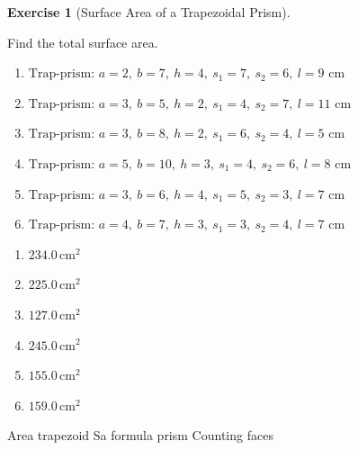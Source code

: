 \documentclass[
  letterpaper,
  DIV=11,
  numbers=noendperiod]{scrreprt}
\theoremstyle{definition}
\newtheorem{exercise}{Exercise}[chapter]
\theoremstyle{remark}
\begin{document}
\begin{exercise}[Surface Area of a Trapezoidal
Prism]\protect\hypertarget{exr-sa-4}{}\label{exr-sa-4}

Find the total surface area.

\begin{enumerate}
\def\labelenumi{\alph{enumi})}
\item
  \(\text{Trap-prism: }a=2,\ b=7,\ h=4,\ s_1=7,\ s_2=6,\ l=9\text{ cm}\)
\item
  \(\text{Trap-prism: }a=3,\ b=5,\ h=2,\ s_1=4,\ s_2=7,\ l=11\text{ cm}\)
\item
  \(\text{Trap-prism: }a=3,\ b=8,\ h=2,\ s_1=6,\ s_2=4,\ l=5\text{ cm}\)
\item
  \(\text{Trap-prism: }a=5,\ b=10,\ h=3,\ s_1=4,\ s_2=6,\ l=8\text{ cm}\)
\item
  \(\text{Trap-prism: }a=3,\ b=6,\ h=4,\ s_1=5,\ s_2=3,\ l=7\text{ cm}\)
\item
  \(\text{Trap-prism: }a=4,\ b=7,\ h=3,\ s_1=3,\ s_2=4,\ l=7\text{ cm}\)
\end{enumerate}

\begin{tcolorbox}[enhanced jigsaw, opacitybacktitle=0.6, coltitle=black, arc=.35mm, colframe=quarto-callout-tip-color-frame, colback=white, bottomrule=.15mm, left=2mm, colbacktitle=quarto-callout-tip-color!10!white, titlerule=0mm, opacityback=0, title=\textcolor{quarto-callout-tip-color}{\faLightbulb}\hspace{0.5em}{🔍 View Solution}, leftrule=.75mm, breakable, rightrule=.15mm, bottomtitle=1mm, toptitle=1mm, toprule=.15mm]

\begin{enumerate}
\def\labelenumi{\alph{enumi})}
\item
  \(234.0\,\text{cm}^{2}\)
\item
  \(225.0\,\text{cm}^{2}\)
\item
  \(127.0\,\text{cm}^{2}\)
\item
  \(245.0\,\text{cm}^{2}\)
\item
  \(155.0\,\text{cm}^{2}\)
\item
  \(159.0\,\text{cm}^{2}\)
\end{enumerate}

\end{tcolorbox}

{Area trapezoid} {Sa formula prism} {Counting faces}

\end{exercise}
\end{document}
